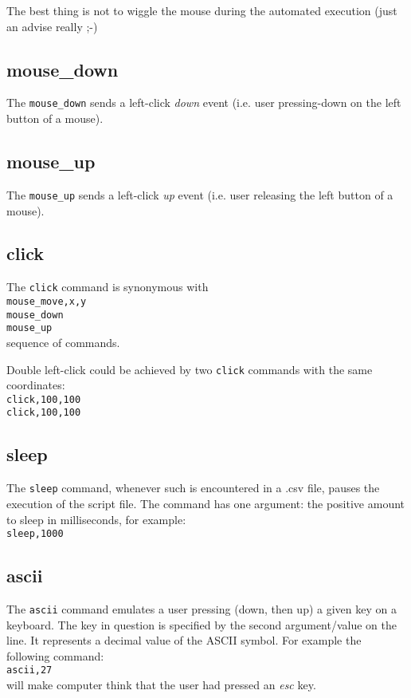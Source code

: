 \documentclass[12pt,a4paper]{article}
\begin{document}
The best thing is not to wiggle the mouse during the automated execution (just an advise really ;-)

\subsection{mouse\_down}
The \texttt{mouse\_down} sends a left-click \textit{down} event (i.e. user pressing-down on the left button of a mouse).

\subsection{mouse\_up}
The \texttt{mouse\_up} sends a left-click \textit{up} event (i.e. user releasing the left button of a mouse).

\subsection{click}
The \texttt{click} command is synonymous with \\
\texttt{mouse\_move,x,y} \\
\texttt{mouse\_down} \\
\texttt{mouse\_up} \\
sequence of commands.

Double left-click could be achieved by two \texttt{click} commands with the same coordinates: \\
\texttt{click,100,100} \\
\texttt{click,100,100}

\subsection{sleep}
The \texttt{sleep} command, whenever such is encountered in a .csv file, pauses the execution of the script file. The command has one argument: the positive amount to sleep in milliseconds, for example: \\
\texttt{sleep,1000}

\subsection{ascii}
The \texttt{ascii} command emulates a user pressing (down, then up) a given key on a keyboard. The key in question is specified by the second argument/value on the line. It represents a decimal value of the ASCII symbol. For example the following command: \\
\texttt{ascii,27} \\
will make computer think that the user had pressed an \textit{esc} key.
\end{document}
